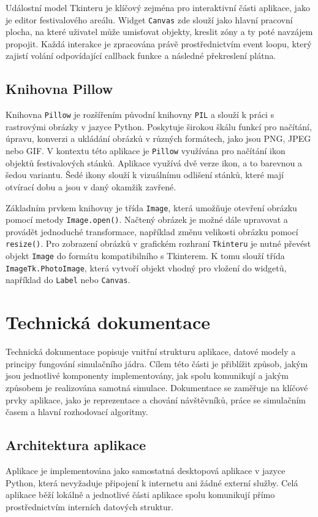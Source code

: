 \documentclass[
  program=itp,
  biblatex,
  figures=false,
  glossaries,
  index
]{kidiplom}
\begin{document}
Událostní model Tkinteru je klíčový zejména pro interaktivní části aplikace, jako je editor festivalového areálu. Widget \texttt{Canvas} zde slouží jako hlavní pracovní plocha, na které uživatel může umisťovat objekty, kreslit zóny a ty poté navzájem propojit. Každá interakce je zpracována právě prostřednictvím event loopu, který zajistí volání odpovídající callback funkce a následné překreslení plátna.

\subsection{Knihovna Pillow}

Knihovna \texttt{Pillow} je rozšířením původní knihovny \texttt{PIL} a slouží k práci s rastrovými obrázky v jazyce Python. Poskytuje širokou škálu funkcí pro načítání, úpravu, konverzi a ukládání obrázků v různých formátech, jako jsou PNG, JPEG nebo GIF. V kontextu této aplikace je \texttt{Pillow} využívána pro načítání ikon objektů festivalových stánků. Aplikace využívá dvě verze ikon, a to barevnou a šedou variantu. Šedé ikony slouží k vizuálnímu odlišení stánků, které mají otvírací dobu a jsou v daný okamžik zavřené. 

Základním prvkem knihovny je třída \texttt{Image}, která umožňuje otevření obrázku pomocí metody \texttt{Image.open()}. Načtený obrázek je možné dále upravovat a provádět jednoduché transformace, například změnu velikosti obrázku pomocí \texttt{resize()}. Pro zobrazení obrázků v grafickém rozhraní \texttt{Tkinteru} je nutné převést objekt \texttt{Image} do formátu kompatibilního s Tkinterem. K tomu slouží třída \texttt{ImageTk.PhotoImage}, která vytvoří objekt vhodný pro vložení do widgetů, například do \texttt{Label} nebo \texttt{Canvas}.


\section{Technická dokumentace}
Technická dokumentace popisuje vnitřní strukturu aplikace, datové modely a principy fungování simulačního jádra. Cílem této části je přiblížit způsob, jakým jsou jednotlivé komponenty implementovány, jak spolu komunikují a jakým způsobem je realizována samotná simulace. Dokumentace se zaměřuje na klíčové prvky aplikace, jako je reprezentace a chování návštěvníků, práce se simulačním časem a hlavní rozhodovací algoritmy. 

\subsection{Architektura aplikace}
Aplikace je implementována jako samostatná desktopová aplikace v jazyce Python, která nevyžaduje připojení k internetu ani žádné externí služby. Celá aplikace běží lokálně a jednotlivé části aplikace spolu komunikují přímo prostřednictvím interních datových struktur.
\end{document}
